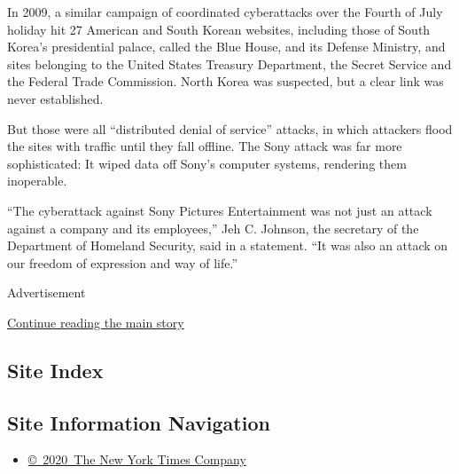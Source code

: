 In 2009, a similar campaign of coordinated cyberattacks over the Fourth
of July holiday hit 27 American and South Korean websites, including
those of South Korea's presidential palace, called the Blue House, and
its Defense Ministry, and sites belonging to the United States Treasury
Department, the Secret Service and the Federal Trade Commission. North
Korea was suspected, but a clear link was never established.

But those were all ``distributed denial of service'' attacks, in which
attackers flood the sites with traffic until they fall offline. The Sony
attack was far more sophisticated: It wiped data off Sony's computer
systems, rendering them inoperable.

``The cyberattack against Sony Pictures Entertainment was not just an
attack against a company and its employees,'' Jeh C. Johnson, the
secretary of the Department of Homeland Security, said in a statement.
``It was also an attack on our freedom of expression and way of life.''

Advertisement

\protect\hyperlink{after-bottom}{Continue reading the main story}

\hypertarget{site-index}{%
\subsection{Site Index}\label{site-index}}

\hypertarget{site-information-navigation}{%
\subsection{Site Information
Navigation}\label{site-information-navigation}}

\begin{itemize}
\tightlist
\item
  \href{https://help.nytimes.com/hc/en-us/articles/115014792127-Copyright-notice}{©~2020~The
  New York Times Company}
\end{itemize}

